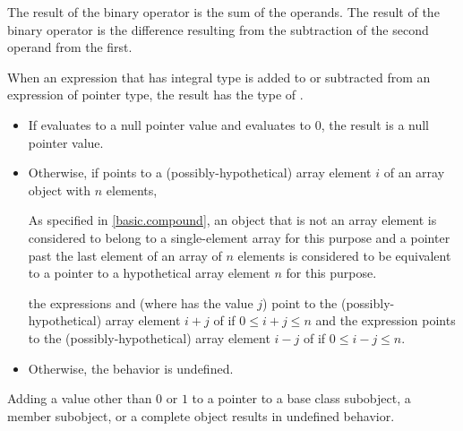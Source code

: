 \pnum
The result of the binary \tcode{+} operator is the sum of the operands.
The result of the binary \tcode{-} operator is the difference resulting
from the subtraction of the second operand from the first.

\pnum
{}%
When an expression  that has integral type
is added to or subtracted from an expression  of pointer type,
the result has the type of .
\begin{itemize}
\item If  evaluates to a null pointer value and
 evaluates to 0, the result is a null pointer value.
\item Otherwise, if  points to a (possibly-hypothetical) array element $i$
of an array object  with $n$ elements,
\begin{footnote}
As specified in \ref{basic.compound},
an object that is not an array element
is considered to belong to a single-element array for this purpose and
a pointer past the last element of an array of $n$ elements
is considered to be equivalent to a pointer to a hypothetical array element
$n$ for this purpose.
\end{footnote}
the expressions  and 
(where  has the value $j$)
point to the (possibly-hypothetical) array element
$i + j$ of  if $0 \le i + j \le n$
and the expression 
points to the (possibly-hypothetical) array element
$i - j$ of  if $0 \le i - j \le n$.
\item Otherwise, the behavior is undefined.
%
%
%
%
%
\end{itemize}
\begin{note}
Adding a value other than $0$ or $1$
to a pointer to a base class subobject, a member subobject,
or a complete object results in undefined behavior.
\end{note}

